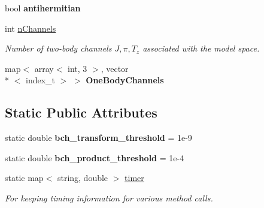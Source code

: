 \begin{DoxyCompactItemize}
\item 
\hypertarget{classOperator_a86dd30fca215948dd9307fa45b7a2e32}{bool {\bfseries antihermitian}}\label{classOperator_a86dd30fca215948dd9307fa45b7a2e32}

\item 
\hypertarget{classOperator_a710cd3c6107a4497e90a04c1f3d2b15f}{int \hyperlink{classOperator_a710cd3c6107a4497e90a04c1f3d2b15f}{n\-Channels}}\label{classOperator_a710cd3c6107a4497e90a04c1f3d2b15f}

\begin{DoxyCompactList}\small\item\em Number of two-\/body channels $ J,\pi,T_z $ associated with the model space. \end{DoxyCompactList}\item 
\hypertarget{classOperator_a380992b76bd3ef1fc2c6dd7e2debf8ff}{map$<$ array$<$ int, 3 $>$, vector\\*
$<$ index\-\_\-t $>$ $>$ {\bfseries One\-Body\-Channels}}\label{classOperator_a380992b76bd3ef1fc2c6dd7e2debf8ff}

\end{DoxyCompactItemize}
\subsection*{Static Public Attributes}
\begin{DoxyCompactItemize}
\item 
\hypertarget{classOperator_af4743d3c6e99ebf1915b348447c8e688}{static double {\bfseries bch\-\_\-transform\-\_\-threshold} = 1e-\/9}\label{classOperator_af4743d3c6e99ebf1915b348447c8e688}

\item 
\hypertarget{classOperator_ad4a2ba438f3286ef22cc06b61f745993}{static double {\bfseries bch\-\_\-product\-\_\-threshold} = 1e-\/4}\label{classOperator_ad4a2ba438f3286ef22cc06b61f745993}

\item 
\hypertarget{classOperator_ae3de2afa3ff3dca088122a79404da831}{static map$<$ string, double $>$ \hyperlink{classOperator_ae3de2afa3ff3dca088122a79404da831}{timer}}\label{classOperator_ae3de2afa3ff3dca088122a79404da831}

\begin{DoxyCompactList}\small\item\em For keeping timing information for various method calls. \end{DoxyCompactList}\end{DoxyCompactItemize}


